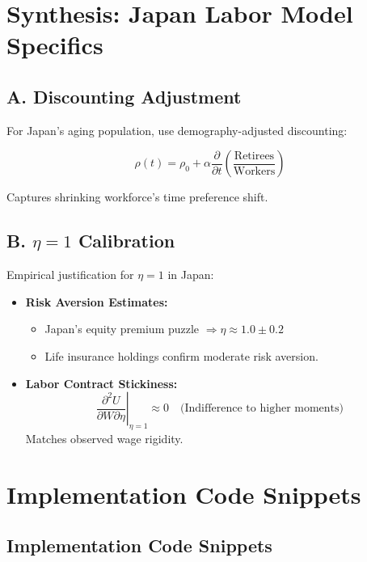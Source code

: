 \documentclass[10pt]{article}
\theoremstyle{definition}
\begin{document}
\section{Synthesis: Japan Labor Model Specifics}

\subsection{A. Discounting Adjustment}

For Japan's aging population, use demography-adjusted discounting:

\begin{equation}
\rho(t) = \rho_0 + \alpha \frac{\partial}{\partial t} \left( \frac{\text{Retirees}}{\text{Workers}} \right)
\end{equation}

Captures shrinking workforce's time preference shift.

\subsection{B. $\eta = 1$ Calibration}

Empirical justification for $\eta = 1$ in Japan:

\begin{itemize}
    \item \textbf{Risk Aversion Estimates:}
        \begin{itemize}
            \item Japan's equity premium puzzle $\Rightarrow \eta \approx 1.0 \pm 0.2$
            \item Life insurance holdings confirm moderate risk aversion.
        \end{itemize}
    \item \textbf{Labor Contract Stickiness:}
        \begin{equation}
        \left. \frac{\partial^2 U}{\partial W \partial \eta} \right|_{\eta=1} \approx 0 \quad \text{(Indifference to higher moments)}
        \end{equation}
        Matches observed wage rigidity.
\end{itemize}

\section{Implementation Code Snippets}
\subsection{Implementation Code Snippets}
\end{document}
